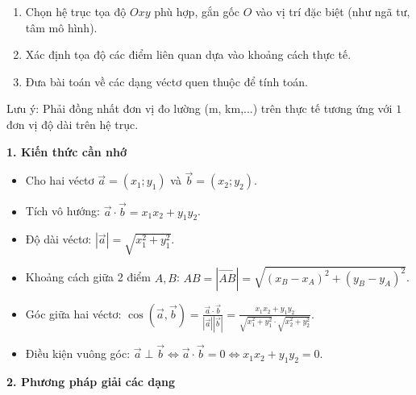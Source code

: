 \begin{enumerate}
\item Chọn hệ trục tọa độ $Oxy$ phù hợp, gắn gốc $O$ vào vị trí đặc biệt (như ngã tư, tâm mô hình).
\item Xác định tọa độ các điểm liên quan dựa vào khoảng cách thực tế.
\item Đưa bài toán về các dạng véctơ quen thuộc để tính toán.
\end{enumerate}
Lưu ý: Phải đồng nhất đơn vị đo lường (m, km,...) trên thực tế tương ứng với $1$ đơn vị độ dài trên hệ trục.

\textbf{1. Kiến thức cần nhớ}
\begin{itemize}
\item Cho hai véctơ $\overrightarrow{a} = (x_1; y_1)$ và $\overrightarrow{b} = (x_2; y_2)$.
\item Tích vô hướng: $\boxed{\overrightarrow{a} \cdot \overrightarrow{b} = x_1 x_2 + y_1 y_2}$.
\item Độ dài véctơ: $|\overrightarrow{a}| = \sqrt{x_1^2 + y_1^2}$.
\item Khoảng cách giữa 2 điểm $A, B$: $AB = |\overrightarrow{AB}| = \sqrt{(x_B - x_A)^2 + (y_B - y_A)^2}$.
\item Góc giữa hai véctơ: $\cos(\overrightarrow{a}, \overrightarrow{b}) = \frac{\overrightarrow{a} \cdot \overrightarrow{b}}{|\overrightarrow{a}| |\overrightarrow{b}|} = \frac{x_1 x_2 + y_1 y_2}{\sqrt{x_1^2 + y_1^2} \cdot \sqrt{x_2^2 + y_2^2}}$.
\item Điều kiện vuông góc: $\overrightarrow{a} \perp \overrightarrow{b} \Leftrightarrow \overrightarrow{a} \cdot \overrightarrow{b} = 0 \Leftrightarrow \boxed{x_1 x_2 + y_1 y_2 = 0}$.
\end{itemize}

\textbf{2. Phương pháp giải các dạng}
